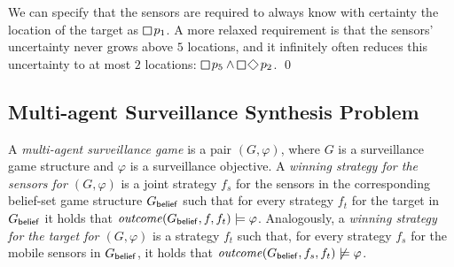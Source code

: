 \begin{example}
We can specify that the sensors are required to always know with certainty the location of the target as
$\LTLglobally p_1$.
A more relaxed requirement is that the sensors' uncertainty never grows above $5$ locations, and it infinitely often reduces this uncertainty to at most $2$ locations: $\LTLglobally p_5 \wedge \LTLglobally\LTLfinally p_2$.
\qed
\end{example}




\subsection{Multi-agent Surveillance Synthesis Problem}
A \emph{multi-agent surveillance game} is a pair $(G,\varphi)$, where $G$ is a surveillance game structure and $\varphi$ is a surveillance objective. A \emph{winning strategy for the sensors for $(G,\varphi)$} is a joint strategy $f_s$ for the sensors in the corresponding belief-set game structure $G_{\mathsf{belief}}$ such that for every strategy $f_t$ for the target in $G_{\mathsf{belief}}$ it holds that $\mathit{outcome}(G_{\mathsf{belief}},f,f_t) \models \varphi$. Analogously, a \emph{winning strategy for the target for $(G,\varphi)$} is a strategy $f_t$ such that, for every strategy $f_s$ for the mobile sensors in $G_{\mathsf{belief}}$, it holds that $\mathit{outcome}(G_{\mathsf{belief}},f_s,f_t) \not\models \varphi$.

